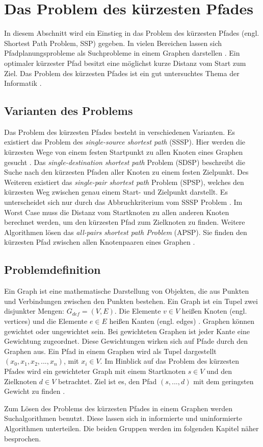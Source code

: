 \chapter{Das Problem des kürzesten Pfades}

In diesem Abschnitt wird ein Einstieg in das Problem des kürzesten Pfades (engl. Shortest Path Problem, SSP) gegeben. In vielen Bereichen lassen sich Pfadplanungsprobleme als Suchprobleme in einem Graphen darstellen \cite{HartNilssonandRaphael.1968}. Ein optimaler kürzester Pfad besitzt eine möglichst kurze Distanz vom Start zum Ziel. Das Problem des kürzesten Pfades ist ein gut untersuchtes Thema der Informatik \cite[S.1]{Madkour.2017}.


\section{Varianten des Problems}

Das Problem des kürzesten Pfades besteht in verschiedenen Varianten. Es existiert das Problem des \textit{single-source shortest path} (SSSP). Hier werden die kürzesten Wege von einem festen Startpunkt zu allen Knoten eines Graphen gesucht \cite[S.644]{Cormen.2009}. Das \textit{single-destination shortest path} Problem (SDSP)  beschreibt die Suche nach den kürzesten Pfaden aller Knoten zu einem festen Zielpunkt. Des Weiteren existiert das \textit{single-pair shortest path} Problem (SPSP), welches den kürzesten Weg zwischen genau einem Start- und Zielpunkt darstellt. Es unterscheidet sich nur durch das Abbruchkriterium vom SSSP Problem \cite{Ottmann.2017}. Im Worst Case muss die Distanz vom Startknoten zu allen anderen Knoten berechnet werden, um den kürzesten Pfad zum Zielknoten zu finden. Weitere Algorithmen lösen das \textit{all-pairs shortest path Problem} (APSP). Sie finden den kürzesten Pfad zwischen allen Knotenpaaren eines Graphen \cite[S.644]{Cormen.2009}.


\section{Problemdefinition}

Ein Graph ist eine mathematische Darstellung von Objekten, die aus Punkten und Verbindungen zwischen den Punkten bestehen. 
Ein Graph ist ein Tupel zwei disjunkter Mengen: $G_{def}= (V,E)$. Die Elemente $v \in V$ heißen Knoten (engl. vertices) und die Elemente $e \in E$ heißen Kanten (engl. edges) \cite[S.15]{Gross.2004}. 
Graphen können gewichtet oder ungewichtet sein. Bei gewichteten Graphen ist jeder Kante eine Gewichtung zugeordnet. 
Diese Gewichtungen wirken sich auf Pfade durch den Graphen aus\cite[S.18]{Gross.2004}. 
Ein Pfad in einem Graphen wird als Tupel dargestellt $\left ( x_{0}, x_{1}, x_{2}, ..., x_{n} \right )$, mit $x_{i} \in V$. 
Im Hinblick auf das Problem des kürzesten Pfades wird ein gewichteter Graph mit einem Startknoten $s \in V$ und den Zielknoten $d \in V$ betrachtet. 
Ziel ist es, den Pfad  $\left ( s, ..., d \right )$ mit dem geringsten Gewicht zu finden \cite[S.4]{Madkour.2017}.

Zum Lösen des Problems des kürzesten Pfades in einem Graphen werden Suchalgorithmen benutzt. Diese lassen sich in informierte und uninformierte Algorithmen unterteilen. Die beiden Gruppen werden im folgenden Kapitel näher besprochen.
